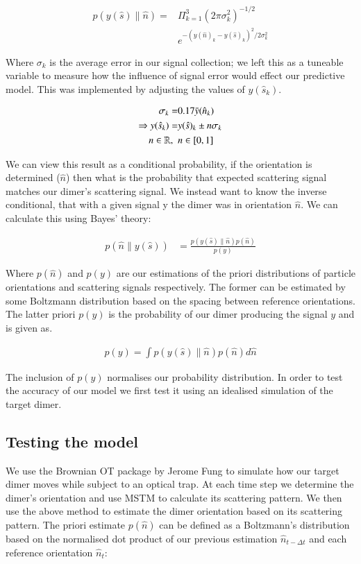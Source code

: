 \documentclass[final,3p, twocolumn]{elsarticle}
\begin{document}
\begin{align}
	p(y(\hat{s})\parallel\hat{n}) =& \Pi^3_{k=1}
	(2\pi\sigma_k^2)^{-1/2} \nonumber \\     &e^{-(y(\hat{n})_k-y(\hat{s})_k)^2/2\sigma_k^2}
\end{align}

Where $\sigma_k$ is the average error in our signal collection; we left this as a tuneable variable to measure how the influence of signal error would effect our predictive model. This was implemented by adjusting the values of $y(\hat{s}_k)$. 

\begin{align}
	\centering
	\sigma_k =& 0.17\bar{y}(\hat{n}_k) \\
	\Rightarrow y(\hat{s}_k) =& y(\hat{s})_k \pm n\sigma_k \\ 
	n \in \mathbb{R}, \ \ & n\in[0,1] \nonumber
\end{align}

We can view this result as a conditional probability, if the orientation is determined ($\hat{n}$) then what is the probability that expected scattering signal matches our dimer's scattering signal. We instead want to know the inverse conditional, that with a given signal y the dimer was in orientation $\hat{n}$. We can calculate this using Bayes' theory:

\begin{align}
	p(\hat{n}\parallel y(\hat{s}))&= \frac{p(y(\hat{s})\parallel\hat{n})p(\hat{n})}{p(y)}
\end{align}

Where $p(\hat{n})$ and $p(y)$ are our estimations of the priori distributions of particle orientations and scattering signals respectively. The former can be estimated by some Boltzmann distribution based on the spacing between reference orientations. The latter priori $p(y)$ is the probability of our dimer producing the signal $y$ and is given as. 

\begin{align}
	p(y) = \int p(y(\hat{s})\parallel \hat{n}) p(\hat{n}) d\hat{n}
\end{align}

The inclusion of $p(y)$ normalises our probability distribution. In order to test the accuracy of our model we first test it using an idealised simulation of the target dimer. 

\subsection{Testing the model}
\label{2.1}
We use the Brownian OT package by Jerome Fung \cite{Vigilante2020Brownian_OT} to simulate how our target dimer moves while subject to an optical trap. At each time step we determine the dimer's orientation and use MSTM to calculate its scattering pattern. We then use the above method to estimate the dimer orientation based on its scattering pattern. The priori estimate $p(\hat{n})$ can be defined as a Boltzmann's distribution based on the normalised dot product of our previous estimation $\hat{n}_{t-\Delta t}$ and each reference orientation $\hat{n}_t$:
\end{document}
